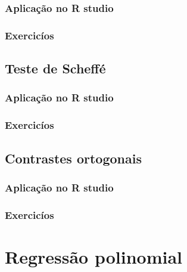 \documentclass[
]{book}
\begin{document}
\hypertarget{aplicauxe7uxe3o-no-r-studio-5}{%
\subsection{Aplicação no R studio}\label{aplicauxe7uxe3o-no-r-studio-5}}

\hypertarget{exercicuxedos-5}{%
\subsection{Exercicíos}\label{exercicuxedos-5}}

\hypertarget{teste-de-scheffuxe9}{%
\section{Teste de Scheffé}\label{teste-de-scheffuxe9}}

\hypertarget{aplicauxe7uxe3o-no-r-studio-6}{%
\subsection{Aplicação no R studio}\label{aplicauxe7uxe3o-no-r-studio-6}}

\hypertarget{exercicuxedos-6}{%
\subsection{Exercicíos}\label{exercicuxedos-6}}

\hypertarget{contrastes-ortogonais}{%
\section{Contrastes ortogonais}\label{contrastes-ortogonais}}

\hypertarget{aplicauxe7uxe3o-no-r-studio-7}{%
\subsection{Aplicação no R studio}\label{aplicauxe7uxe3o-no-r-studio-7}}

\hypertarget{exercicuxedos-7}{%
\subsection{Exercicíos}\label{exercicuxedos-7}}

\hypertarget{regressuxe3o-polinomial}{%
\chapter{Regressão polinomial}\label{regressuxe3o-polinomial}}
\end{document}
